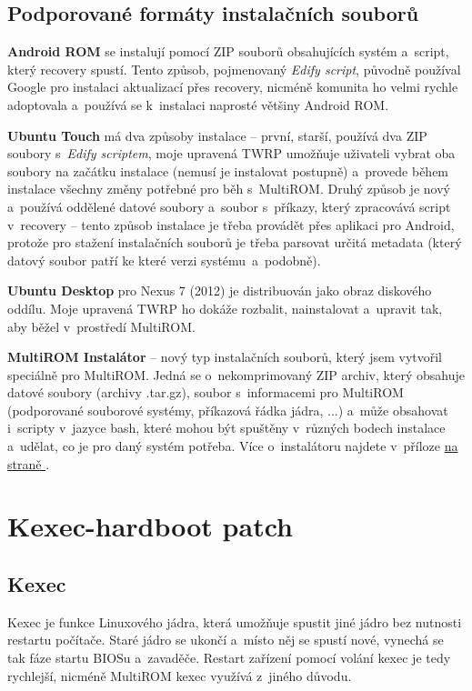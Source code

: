 \documentclass[12pt, a4paper, oneside]{article}
\newcommand{\B}{\textbf} %
\newcommand{\It}{\textit}  %
\newcommand*{\attref}[1]{\hyperref[{#1}]{\uv{\nameref*{#1}} na straně \pageref{#1}}}
\begin{document}
\subsection {Podporované formáty instalačních souborů}
\B{Android ROM} se instalují pomocí ZIP souborů obsahujících systém a~script, který recovery spustí. Tento způsob, pojmenovaný \It{Edify script}, původně používal Google pro instalaci aktualizací přes recovery, nicméně komunita ho velmi rychle adoptovala a~používá se k~instalaci naprosté většiny Android ROM.

\B{Ubuntu Touch} má dva způsoby instalace -- první, starší, používá dva ZIP soubory s~\It{Edify scriptem}, moje upravená TWRP umožňuje uživateli vybrat oba soubory na začátku instalace (nemusí je instalovat postupně) a~provede během instalace všechny změny potřebné pro běh s~MultiROM. Druhý způsob je nový a~používá oddělené datové soubory a~soubor s~příkazy, který zpracovává script v~recovery -- tento způsob instalace je třeba provádět přes aplikaci pro Android, protože pro stažení instalačních souborů je třeba parsovat určitá metadata (který datový soubor patří ke které verzi systému~a~podobně).

\B{Ubuntu Desktop} pro Nexus 7 (2012) je distribuován jako obraz diskového oddílu. Moje upravená TWRP ho dokáže rozbalit, nainstalovat a~upravit tak, aby běžel v~prostředí MultiROM. 

\B{MultiROM Instalátor} -- nový typ instalačních souborů, který jsem vytvořil speciálně pro MultiROM. Jedná se o~nekomprimovaný ZIP archiv, který obsahuje datové soubory (archivy .tar.gz), soubor s~informacemi pro MultiROM (podporované souborové systémy, příkazová řádka jádra, ...) a~může obsahovat i~scripty v~jazyce bash, které mohou být spuštěny v~různých bodech instalace a~udělat, co je pro daný systém potřeba. Více o~instalátoru najdete v~příloze \attref{sec:installer}.

\newpage
\section {Kexec-hardboot patch}
\subsection{Kexec}
Kexec je funkce Linuxového jádra, která umožňuje spustit jiné jádro bez nutnosti restartu počítače. Staré jádro se ukončí a~místo něj se spustí nové, vynechá se tak fáze startu BIOSu a~zavaděče. Restart zařízení pomocí volání kexec je tedy rychlejší, nicméně MultiROM kexec využívá z~jiného důvodu.
\end{document}
